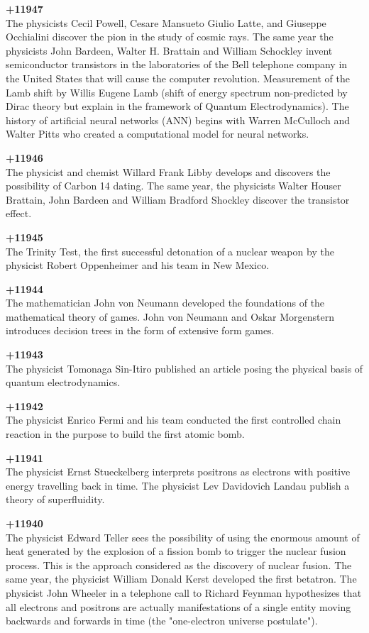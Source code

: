 \textbf{+11947}\\
The physicists Cecil Powell, Cesare Mansueto Giulio Latte, and Giuseppe Occhialini discover the pion in the study of cosmic rays. The same year the physicists John Bardeen, Walter H. Brattain and William Schockley invent semiconductor transistors in the laboratories of the Bell telephone company in the United States that will cause the computer revolution. Measurement of the Lamb shift by Willis Eugene Lamb (shift of energy spectrum non-predicted by Dirac theory but explain in the framework of Quantum Electrodynamics). The history of artificial neural networks (ANN) begins with Warren McCulloch and Walter Pitts  who created a computational model for neural networks.

\textbf{+11946}\\
The physicist and chemist Willard Frank Libby develops and discovers the possibility of Carbon 14 dating. The same year, the physicists Walter Houser Brattain, John Bardeen and William Bradford Shockley discover the transistor effect.

\textbf{+11945}\\
The Trinity Test, the first successful detonation of a nuclear weapon by the physicist Robert Oppenheimer and his team in New Mexico.

\textbf{+11944}\\
The mathematician John von Neumann developed the foundations of the mathematical theory of games. John von Neumann and Oskar Morgenstern introduces decision trees in the form of extensive form games.

\textbf{+11943}\\
The physicist Tomonaga Sin-Itiro published an article posing the physical basis of quantum electrodynamics.

\textbf{+11942}\\
The physicist Enrico Fermi and his team conducted the first controlled chain reaction in the purpose to build the first atomic bomb.

\textbf{+11941}\\
The physicist Ernst Stueckelberg interprets positrons as electrons with positive energy travelling back in time. The physicist Lev Davidovich Landau publish a theory of superfluidity.

\textbf{+11940}\\
The physicist Edward Teller sees the possibility of using the enormous amount of heat generated by the explosion of a fission bomb to trigger the nuclear fusion process. This is the approach considered as the discovery of nuclear fusion. The same year, the physicist William Donald Kerst developed the first betatron. The physicist John Wheeler in a telephone call to Richard Feynman hypothesizes that all electrons and positrons are actually manifestations of a single entity moving backwards and forwards in time (the "one-electron universe postulate").

